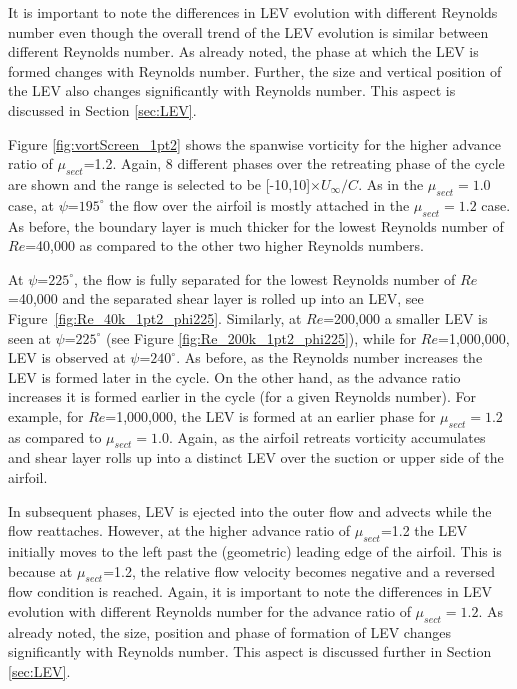 It is important to note the differences in LEV evolution with different Reynolds number even though the overall trend of the LEV evolution is similar between different Reynolds number.
As already noted, the phase at which the LEV is formed changes with Reynolds number.
Further, the size and vertical position of the LEV also changes significantly with Reynolds number.
This aspect is discussed in Section \ref{sec:LEV}.

Figure \ref{fig:vortScreen_1pt2} shows the spanwise vorticity for the higher advance ratio of $\mu_{sect}$=1.2.
Again, 8 different phases over the retreating phase of the cycle are shown and the range is selected to be [-10,10]$\times U_\infty /C$.
As in the $\mu_{sect}=1.0$ case, at $\psi$=$195^\circ$ the flow over the airfoil is mostly attached in the $\mu_{sect}=1.2$ case.
As before, the boundary layer is much thicker for the lowest Reynolds number of $Re$=40,000 as compared to the other two higher Reynolds numbers.

At $\psi$=$225^\circ$, the flow is fully separated for the lowest Reynolds number of $Re$=40,000 and the separated shear layer is rolled up into an LEV, see Figure~\ref{fig:Re_40k_1pt2_phi225}.
Similarly, at $Re$=200,000 a smaller LEV is seen at $\psi$=$225^\circ$ (see Figure \ref{fig:Re_200k_1pt2_phi225}), while for $Re$=1,000,000, LEV is observed at $\psi$=$240^\circ$.
As before, as the Reynolds number increases the LEV is formed later in the cycle.
On the other hand, as the advance ratio increases it is formed earlier in the cycle (for a given Reynolds number).
For example, for $Re$=1,000,000, the LEV is formed at an earlier phase for $\mu_{sect}=1.2$ as compared to $\mu_{sect}=1.0$.
Again, as the airfoil retreats vorticity accumulates and shear layer rolls up into a distinct LEV over the suction or upper side of the airfoil.

In subsequent phases, LEV is ejected into the outer flow and advects while the flow reattaches.
However, at the higher advance ratio of $\mu_{sect}$=1.2 the LEV initially moves to the left past the (geometric) leading edge of the airfoil.
This is because at $\mu_{sect}$=1.2, the relative flow velocity becomes negative and a reversed flow condition is reached.
Again, it is important to note the differences in LEV evolution with different Reynolds number for the advance ratio of $\mu_{sect}=1.2$.
As already noted, the size, position and phase of formation of LEV changes significantly with Reynolds number.
This aspect is discussed further in Section \ref{sec:LEV}.

